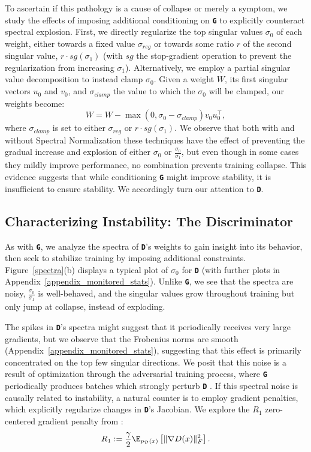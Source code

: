 \documentclass{article} %
\newcommand{\gen}{\textbf{\texttt{G}}}
\newcommand{\discr}{\textbf{\texttt{D}}}
\begin{document}
To ascertain if this pathology is a cause of collapse or merely a symptom, we study the effects of imposing additional conditioning on \gen{} to explicitly counteract spectral explosion. First, we directly regularize the top singular values $\sigma_0$ of each weight, either towards a fixed value $\sigma_{reg}$ or towards some ratio $r$ of the second singular value, $r \cdot sg(\sigma_1)$ (with $sg$ the stop-gradient operation to prevent the regularization from increasing $\sigma_1$). Alternatively, we employ a partial singular value decomposition to instead clamp $\sigma_0$.  Given a weight $W$, its first singular vectors $u_0$ and $v_0$, and $\sigma_{clamp}$ the value to which the $\sigma_0$ will be clamped, our weights become:
\begin{equation}
    W = W - \max(0, \sigma_0 - \sigma_{clamp}) v_0 u_0^\top,
\end{equation}
where $\sigma_{clamp}$ is set to either $\sigma_{reg}$ or $r \cdot sg(\sigma_1)$. We observe that both with and without Spectral Normalization these techniques have the effect of preventing the gradual increase and explosion of either $\sigma_0$ or $\frac{\sigma_0}{\sigma_1}$, but even though in some cases they mildly improve performance, no combination prevents training collapse. This evidence suggests that while conditioning \gen{} might improve stability, it is insufficient to ensure stability. We accordingly turn our attention to \discr{}.



\subsection{Characterizing Instability: The Discriminator}
\label{subsec:discr_instability}

As with \gen{}, we analyze the spectra of \discr{}'s weights to gain insight into its behavior, then seek to stabilize training by imposing additional constraints. Figure~\ref{spectra}(b)  displays a typical plot of $\sigma_0$ for \discr{} (with further plots in Appendix~\ref{appendix_monitored_stats}). Unlike \gen{}, we see that the spectra are noisy, $\frac{\sigma_0}{\sigma_1}$ is well-behaved, and the singular values grow throughout training but only jump at collapse, instead of exploding.

The spikes in \discr{}'s spectra might suggest that it periodically receives very large gradients, but we observe that the Frobenius norms are smooth (Appendix~\ref{appendix_monitored_stats}), suggesting that this effect is primarily concentrated on the top few singular directions. We posit that this noise is a result of optimization through the adversarial training process, where \gen{} periodically produces batches which strongly perturb \discr{} . If this spectral noise is causally related to instability, a natural counter is to employ gradient penalties, which explicitly regularize changes in \discr{}'s Jacobian. We explore the $R_1$ zero-centered gradient penalty from \citet{mescheder2018r1gp}:
\begin{equation}
\label{eq:discriminator}
R_1:=
\frac{\gamma}{2} \E_{ p_{\mathcal D}(x)}
\left[
\|\nabla D(x)\|_F^2
\right].
\end{equation}
\end{document}
